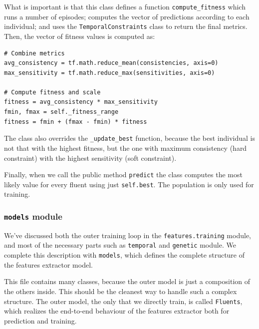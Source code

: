 What is important is that this class defines a function \verb|compute_fitness|
which runs a number of episodes; computes the vector of predictions according
to each individual; and uses the \texttt{TemporalConstraints} class to return
the final metrics. Then, the vector of fitness values is computed as:
\begin{verbatim}
# Combine metrics
avg_consistency = tf.math.reduce_mean(consistencies, axis=0)
max_sensitivity = tf.math.reduce_max(sensitivities, axis=0)

# Compute fitness and scale
fitness = avg_consistency * max_sensitivity
fmin, fmax = self._fitness_range
fitness = fmin + (fmax - fmin) * fitness
\end{verbatim}

The class also overrides the \verb|_update_best| function, because the best
individual is not that with the highest fitness, but the one with maximum
consistency (hard constraint) with the highest sensitivity (soft constraint).

Finally, when we call the public method \texttt{predict} the class computes
the most likely value for every fluent using just \verb|self.best|. The
population is only used for training.


\subsubsection*{\texttt{models} module}

We've discussed both the outer training loop in the \verb|features.training|
module, and most of the necessary parts such as \texttt{temporal} and
\texttt{genetic} module. We complete this description with \texttt{models},
which defines the complete structure of the features extractor model.

This file contains many classes, because the outer model is just a composition
of the others inside. This should be the cleanest way to handle such a complex
structure. The outer model, the only that we directly train, is called
\texttt{Fluents}, which realizes the end-to-end behaviour of the features
extractor both for prediction and training.

